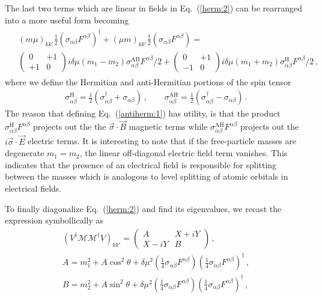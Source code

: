 \documentclass[addchapnum]{ws-rv961x669} %
\newcommand{\req}[1]{Eq.~(\ref{#1})}
\begin{document}
The last two terms which are linear in fields in \req{herm:2} can be rearranged into a more useful form becoming
\begin{align}
    \label{herm:4}
    \begin{split}
    &(m\mu)_{kk'}\frac{1}{2}\left(\sigma_{\alpha\beta}F^{\alpha\beta}\right)^{\dag}
    +(\mu m)_{kk'}\frac{1}{2}\left(\sigma_{\alpha\beta}F^{\alpha\beta}\right)=\\
    &\begin{pmatrix}
        0 & +1\\
        +1 & 0
    \end{pmatrix}i\delta\mu(m_{1}-m_{2})\sigma_{\alpha\beta}^\mathrm{AH}F^{\alpha\beta}/2
    +
    \begin{pmatrix}
        0 & +1\\
        -1 & 0
    \end{pmatrix}i\delta\mu(m_{1}+m_{2})\sigma_{\alpha\beta}^\mathrm{H}F^{\alpha\beta}/2\,,
    \end{split}
\end{align}
where we define the Hermitian and anti-Hermitian portions of the spin tensor
\begin{align}
    \label{antiherm:1}
    \sigma_{\alpha\beta}^\mathrm{H}=\frac{1}{2}\left(\sigma_{\alpha\beta}^{\dag} + \sigma_{\alpha\beta}\right)\,,\qquad
    \sigma_{\alpha\beta}^\mathrm{AH}=\frac{1}{2}\left(\sigma_{\alpha\beta}^{\dag} - \sigma_{\alpha\beta}\right)\,.
\end{align}
The reason that defining \req{antiherm:1} has utility, is that the product $\sigma_{\alpha\beta}^\mathrm{H}F^{\alpha\beta}$ projects out the the $\vec{\sigma}\cdot\vec{B}$ magnetic terms while $\sigma_{\alpha\beta}^\mathrm{AH}F^{\alpha\beta}$ projects out the $i\vec{\sigma}\cdot\vec{E}$ electric terms. It is interesting to note that if the free-particle masses are degenerate $m_{1}=m_{2}$, the linear off-diagonal electric field term vanishes. This indicates that the presence of an electrical field is responsible for splitting between the masses which is analogous to level splitting of atomic orbitals in electrical fields.

To finally diagonalize \req{herm:2} and find its eigenvalues, we recast the expression symbollically as
\begin{align}
    \label{herm:4}
    (V^{\dag}\mathcal{M}\mathcal{M}^{\dag}V)_{kk'} =
    \begin{pmatrix}
        A & X+iY\\
        X-iY & B
    \end{pmatrix}\,,\\
    A = m_{1}^{2}+A\cos^{2}\theta+\delta\mu^{2}\left(\frac{1}{4}\sigma_{\alpha\beta}F^{\alpha\beta}\right)\left(\frac{1}{4}\sigma_{\alpha\beta}F^{\alpha\beta}\right)^{\dag}\,,\\
    B = m_{2}^{2}+A\sin^{2}\theta+\delta\mu^{2}\left(\frac{1}{4}\sigma_{\alpha\beta}F^{\alpha\beta}\right)\left(\frac{1}{4}\sigma_{\alpha\beta}F^{\alpha\beta}\right)^{\dag}\,,
\end{align}
\end{document}
